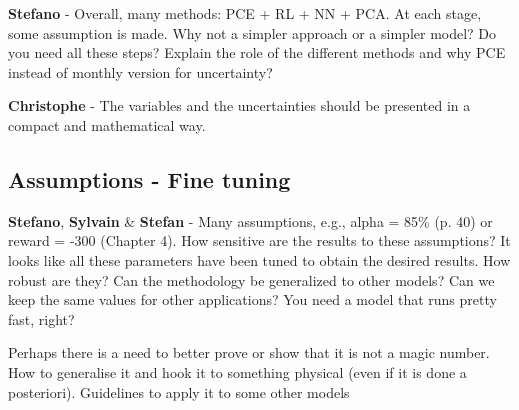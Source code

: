 \documentclass[12pt,a4paper]{article}
\begin{document}
\begin{mdframed}[style=comment] %
{\color{orange} \textbf{Stefano}} - Overall, many methods: PCE + RL + NN + PCA. At each stage, some assumption is made. Why not a simpler approach or a simpler model? Do you need all these steps? Explain the role of the different methods and why PCE instead of monthly version for uncertainty? 
\end{mdframed}

\noindent

\begin{mdframed}[style=manuscript] %

\end{mdframed}

\begin{mdframed}[style=comment] %
{\color{violet} \textbf{Christophe}} - The variables and the uncertainties should be presented in a compact and mathematical way.
\end{mdframed}

\noindent

\begin{mdframed}[style=manuscript] %

\end{mdframed}


\subsection{Assumptions - Fine tuning}
\label{fine_tuning}

\begin{mdframed}[style=comment] %
{\color{orange} \textbf{Stefano}}, {\color{purple} \textbf{Sylvain}} \& {\color{teal} \textbf{Stefan}} - Many assumptions, e.g., alpha = 85\% (p. 40) or reward = -300 (Chapter 4). How sensitive are the results to these assumptions? It looks like all these parameters have been tuned to obtain the desired results. How robust are they? Can the methodology be generalized to other models? Can we keep the same values for other applications? You need a model that runs pretty fast, right?
\end{mdframed}

\noindent Perhaps there is a need to better prove or show that it is not a magic number.  How to generalise it and hook it to something physical (even if it is done a posteriori). Guidelines to apply it to some other models
\end{document}
